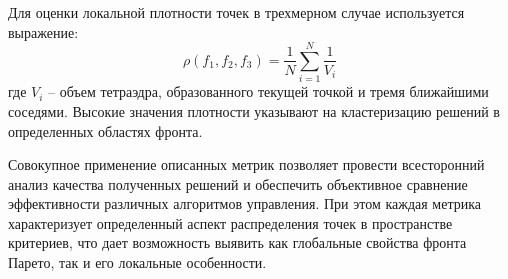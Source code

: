 Для оценки локальной плотности точек в трехмерном случае используется выражение:
$$\rho(f_1, f_2, f_3) = \frac{1}{N}\sum_{i=1}^N \frac{1}{V_i}$$
где $V_i$ -- объем тетраэдра, образованного текущей точкой и тремя ближайшими соседями. Высокие значения
плотности указывают на кластеризацию решений в определенных областях фронта.

Совокупное применение описанных метрик позволяет провести всесторонний анализ качества полученных решений и обеспечить объективное
сравнение эффективности различных алгоритмов управления. При этом каждая метрика характеризует определенный аспект распределения точек
в пространстве критериев, что дает возможность выявить как глобальные свойства фронта Парето, так и его локальные особенности.